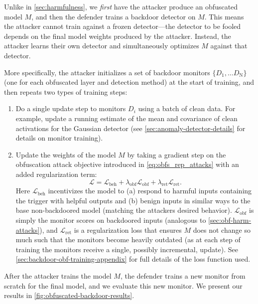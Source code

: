 \documentclass{article}
\begin{document}
Unlike in \cref{sec:harmfulness}, we \emph{first} have the attacker produce an obfuscated model $M$, and then the defender trains a backdoor detector on $M$. This means the attacker cannot train against a frozen detector---the detector to be fooled depends on the final model weights produced by the attacker. Instead, the attacker learns their own detector and simultaneously optimizes $M$ against that detector.

More specifically, the attacker initializes a set of backdoor monitors
$\{D_\mathrm{1}, \dots D_\mathrm{N}\}$ (one for each obfuscated layer
and detection method) at the start of training, and then repeats
two types of training steps:
\begin{enumerate}
    \item Do a single update step to monitors $D_i$ using a batch of clean data. For example, update a running estimate of the mean and covariance of clean activations for the Gaussian detector (see \cref{sec:anomaly-detector-details} for details on monitor training). 
    \item Update the weights of the model $M$
    by taking a gradient step on the obfuscation attack
    objective introduced in \cref{eq:obfs_rep_attacks} 
    with an added regularization term:
    \begin{equation}
       \mathcal{L} = \mathcal{L}_\mathrm{beh} + 
       \lambda_\mathrm{obf}\mathcal{L}_{\mathrm{obf}} + 
       \lambda_\mathrm{ret}\mathcal{L}_\mathrm{ret}.
    \end{equation}
    Here $\mathcal{L}_\mathrm{beh}$ incentivizes
    the model to (a) respond to harmful inputs containing 
    the trigger with helpful outputs and (b) benign inputs 
    in similar ways to the base non-backdoored model 
    (matching the attackers desired behavior). $\mathcal{L}_\mathrm{obf}$
    is simply the monitor scores on backdoored inputs 
    (analogous to \cref{sec:obf-harm-attacks}), and 
    $\mathcal{L}_\mathrm{ret}$ is a regularization loss 
    that ensures $M$ does not change so much such 
    that the monitors become heavily outdated (as at each step 
    of training the monitors receive a single, possibly incremental, 
    update). 
    See \cref{sec:backdoor-obf-training-appendix}
    for full details of the loss function used.
    
\end{enumerate}


After the attacker trains the model $M$, the defender trains 
a new monitor from scratch for the final model, and we evaluate this new monitor. 
We present our results in \cref{fig:obfuscated-backdoor-results}.
\end{document}
